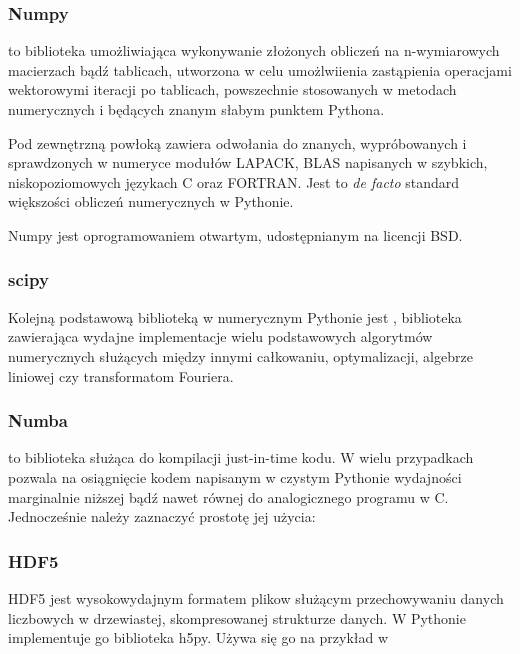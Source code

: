     \subsubsection{Numpy}
     to biblioteka umożliwiająca wykonywanie złożonych obliczeń na n-wymiarowych macierzach
    bądź tablicach, utworzona w celu umożlwiienia zastąpienia operacjami wektorowymi iteracji po tablicach,
    powszechnie stosowanych w metodach numerycznych i będących znanym słabym punktem Pythona.

    Pod zewnętrzną powłoką zawiera odwołania do
    znanych, wypróbowanych i sprawdzonych w numeryce modułów LAPACK, BLAS
    napisanych w szybkich, niskopoziomowych językach C oraz FORTRAN. Jest to \emph{de facto}
    standard większości obliczeń numerycznych w Pythonie.

    Numpy jest oprogramowaniem otwartym, udostępnianym na licencji BSD. %

    \subsubsection{scipy}
    Kolejną podstawową biblioteką w numerycznym Pythonie jest , biblioteka
    zawierająca wydajne implementacje wielu podstawowych algorytmów numerycznych służących
    między innymi całkowaniu, optymalizacji, algebrze liniowej czy transformatom Fouriera.

    \subsubsection{Numba}
     to biblioteka służąca do kompilacji just-in-time kodu. 
    W wielu przypadkach 
    pozwala na osiągnięcie kodem napisanym w czystym Pythonie wydajności marginalnie
    niższej bądź nawet równej do analogicznego programu w C. 
    Jednocześnie należy zaznaczyć prostotę jej użycia: 



    \subsubsection{HDF5}
    HDF5 jest wysokowydajnym formatem plikow służącym przechowywaniu danych liczbowych w drzewiastej,
    skompresowanej strukturze danych.
    W Pythonie implementuje go biblioteka h5py. 
    Używa się go na przykład w 

